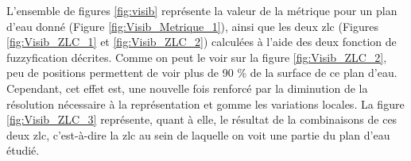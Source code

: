 L'ensemble de figures \ref{fig:visib} représente la valeur de la
métrique  pour un plan d'eau donné (Figure
\ref{fig:Visib_Metrique_1}), ainsi que les deux \ac{zlc} (Figures
\ref{fig:Visib_ZLC_1} et \ref{fig:Visib_ZLC_2}) calculées à l'aide des
deux fonction de fuzzyfication décrites. Comme on peut le voir sur la
figure \ref{fig:Visib_ZLC_2}, peu de positions permettent de voir plus
de 90 \% de la surface de ce plan d'eau. Cependant, cet effet est, une
nouvelle fois renforcé par la diminution de la résolution nécessaire à
la représentation et gomme les variations locales. La figure
\ref{fig:Visib_ZLC_3} représente, quant à elle, le résultat de la
combinaisons de ces deux \ac{zlc}, c'est-à-dire la \ac{zlc} au sein de
laquelle on voit une partie du plan d'eau étudié.

\begin{figure}
  \centering
  \hspace{1cm}
  \subfloat[\label{fig:Visib_ZLC_1}]{%
}
\end{figure}
